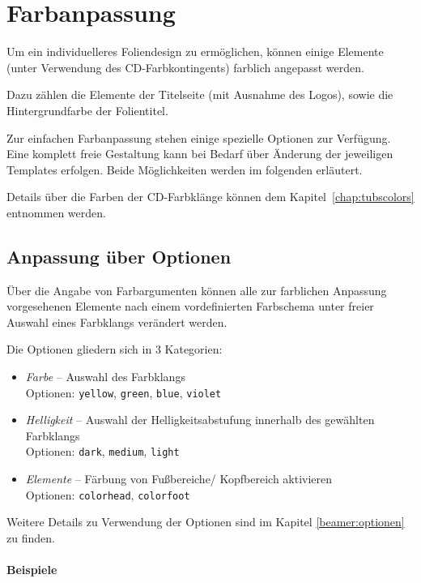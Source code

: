 \section{Farbanpassung}

Um ein individuelleres Foliendesign zu ermöglichen, können einige Elemente
(unter Verwendung des CD-Farbkontingents)
farblich angepasst werden.

Dazu zählen die Elemente der Titelseite (mit Ausnahme des Logos),
sowie die Hintergrundfarbe der Folientitel.

Zur einfachen Farbanpassung stehen einige spezielle Optionen zur Verfügung.
Eine komplett freie Gestaltung kann bei Bedarf über Änderung der
jeweiligen Templates erfolgen. Beide Möglichkeiten werden im folgenden
erläutert.

Details über die Farben der CD-Farbklänge können dem
Kapitel~\ref{chap:tubscolors} entnommen werden.

\subsection{Anpassung über Optionen}

Über die Angabe von Farbargumenten können alle zur farblichen Anpassung
vorgesehenen Elemente nach einem vordefinierten Farbschema unter freier Auswahl
eines Farbklangs verändert werden.

Die Optionen gliedern sich in 3 Kategorien:
\begin{itemize}
  \item \emph{Farbe} -- Auswahl des Farbklangs\\
    Optionen: \texttt{yellow}, \texttt{green}, \texttt{blue}, \texttt{violet}
  \item \emph{Helligkeit} -- Auswahl der Helligkeitsabstufung
    innerhalb des gewählten Farbklangs\\
    Optionen: \texttt{dark}, \texttt{medium}, \texttt{light}
  \item \emph{Elemente} -- Färbung von Fußbereiche/ Kopfbereich aktivieren\\
    Optionen: \texttt{colorhead}, \texttt{colorfoot}
\end{itemize}

Weitere Details zu Verwendung der Optionen sind im Kapitel \ref{beamer:optionen}
zu finden.

\clearpage
\paragraph{Beispiele}\hfill\\

